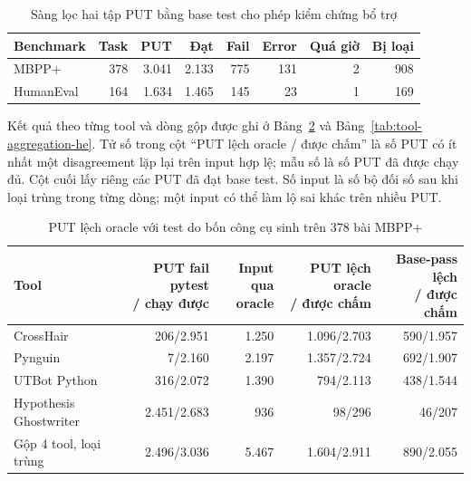 \begin{table}[!htbp]
\centering
\caption{Sàng lọc hai tập PUT bằng base test cho phép kiểm chứng bổ trợ}
\label{tab:tool-base-screen}
\small
\begin{tabular*}{\linewidth}{@{\extracolsep{\fill}}lrrrrrrr@{}}
\toprule
Benchmark & Task & PUT & Đạt & Fail & Error & Quá giờ & Bị loại \\
\midrule
MBPP+ & 378 & 3.041 & 2.133 & 775 & 131 & 2 & 908 \\
HumanEval & 164 & 1.634 & 1.465 & 145 & 23 & 1 & 169 \\
\bottomrule
\end{tabular*}
\end{table}

Kết quả theo từng tool và dòng gộp được ghi ở Bảng~\ref{tab:tool-aggregation-mbpp} và Bảng~\ref{tab:tool-aggregation-he}. Tử số trong cột ``PUT lệch oracle / được chấm'' là số PUT có ít nhất một disagreement lặp lại trên input hợp lệ; mẫu số là số PUT đã được chạy đủ. Cột cuối lấy riêng các PUT đã đạt base test. Số input là số bộ đối số sau khi loại trùng trong từng dòng; một input có thể làm lộ sai khác trên nhiều PUT.

\begin{table}[!htbp]
\centering
\caption{PUT lệch oracle với test do bốn công cụ sinh trên 378 bài MBPP+}
\label{tab:tool-aggregation-mbpp}
\scriptsize
\begin{tabular*}{\linewidth}{@{\extracolsep{\fill}}lrrrr@{}}
\toprule
Tool & \shortstack{PUT fail pytest\\ / chạy được} & \shortstack{Input\\qua oracle} & \shortstack{PUT lệch oracle\\ / được chấm} & \shortstack{Base-pass lệch\\ / được chấm} \\
\midrule
CrossHair & 206/2.951 & 1.250 & 1.096/2.703 & 590/1.957 \\
Pynguin & 7/2.160 & 2.197 & 1.357/2.724 & 692/1.907 \\
UTBot Python & 316/2.072 & 1.390 & 794/2.113 & 438/1.544 \\
Hypothesis Ghostwriter & 2.451/2.683 & 936 & 98/296 & 46/207 \\
\midrule
Gộp 4 tool, loại trùng & 2.496/3.036 & 5.467 & 1.604/2.911 & 890/2.055 \\
\bottomrule
\end{tabular*}
\end{table}

